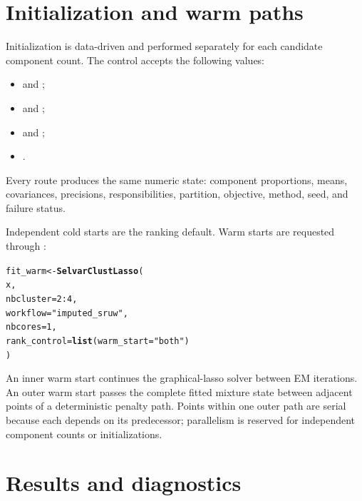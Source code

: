 \documentclass[10pt]{article}\usepackage[]{graphicx}\usepackage[]{xcolor}
\makeatletter
\newcommand{\hlnum}[1]{\textcolor[rgb]{0.686,0.059,0.569}{#1}}%
\newcommand{\hlsng}[1]{\textcolor[rgb]{0.192,0.494,0.8}{#1}}%
\newcommand{\hlopt}[1]{\textcolor[rgb]{0,0,0}{#1}}%
\newcommand{\hldef}[1]{\textcolor[rgb]{0.345,0.345,0.345}{#1}}%
\newcommand{\hlkwb}[1]{\textcolor[rgb]{0.69,0.353,0.396}{#1}}%
\newcommand{\hlkwc}[1]{\textcolor[rgb]{0.333,0.667,0.333}{#1}}%
\newcommand{\hlkwd}[1]{\textcolor[rgb]{0.737,0.353,0.396}{\textbf{#1}}}%
\newenvironment{kframe}{%
 \def\at@end@of@kframe{}%
 \ifinner\ifhmode%
  \def\at@end@of@kframe{\end{minipage}}%
  \begin{minipage}{\columnwidth}%
 \fi\fi%
 \def\FrameCommand##1{\hskip\@totalleftmargin \hskip-\fboxsep
 \colorbox{shadecolor}{##1}\hskip-\fboxsep
     \hskip-\linewidth \hskip-\@totalleftmargin \hskip\columnwidth}%
 \MakeFramed {\advance\hsize-\width
   \@totalleftmargin\z@ \linewidth\hsize
   \@setminipage}}%
 {\par\unskip\endMakeFramed%
 \at@end@of@kframe}
\newenvironment{knitrout}{}{} %
\makeatother
\begin{document}
\section{Initialization and warm paths}

Initialization is data-driven and performed separately for each candidate
component count. The control  accepts the following
values:
\begin{itemize}
\item {} and ;
\item {} and ;
\item {} and ;
\item {}.
\end{itemize}
Every route produces the same numeric state: component proportions,
means, covariances, precisions, responsibilities, partition, objective,
method, seed, and failure status.

Independent cold starts are the ranking default. Warm starts are requested
through :

\begin{knitrout}
\color{fgcolor}\begin{kframe}
\begin{alltt}
\hldef{fit_warm} \hlkwb{<-} \hlkwd{SelvarClustLasso}\hldef{(}
 \hldef{x,}
 \hlkwc{nbcluster} \hldef{=} \hlnum{2}\hlopt{:}\hlnum{4}\hldef{,}
 \hlkwc{workflow} \hldef{=} \hlsng{"imputed_sruw"}\hldef{,}
 \hlkwc{nbcores} \hldef{=} \hlnum{1}\hldef{,}
 \hlkwc{rank_control} \hldef{=} \hlkwd{list}\hldef{(}\hlkwc{warm_start} \hldef{=} \hlsng{"both"}\hldef{)}
\hldef{)}
\end{alltt}
\end{kframe}
\end{knitrout}

An inner warm start continues the graphical-lasso solver between EM
iterations. An outer warm start passes the complete fitted mixture state
between adjacent points of a deterministic penalty path. Points within one
outer path are serial because each depends on its predecessor; parallelism is
reserved for independent component counts or initializations.

\section{Results and diagnostics}
\end{document}
